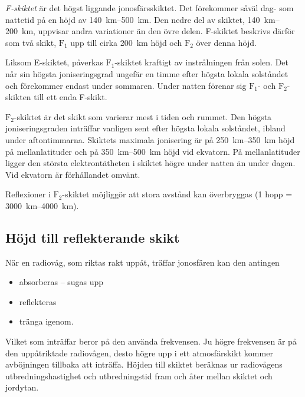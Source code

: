 \emph{F-skiktet} är det högst liggande jonosfärsskiktet.
Det förekommer såväl dag- som nattetid på en höjd av
\SIrange{140}{500}{\kilo\metre}.
Den nedre del av skiktet, \SIrange{140}{200}{\kilo\metre}, uppvisar andra
variationer än den övre delen.
F-skiktet beskrivs därför som två skikt, \(\mathrm{F_1}\) upp till cirka
\SI{200}{\kilo\metre} höjd och \(\mathrm{F_2}\) över denna höjd.

Liksom E-skiktet, påverkas \(\mathrm{F_1}\)-skiktet kraftigt av
instrålningen från solen.
Det når sin högsta joniseringsgrad ungefär en timme efter högsta lokala
solståndet och förekommer endast under sommaren.
Under natten förenar sig \(\mathrm{F_1}\)- och \(\mathrm{F_2}\)-skikten till
ett enda F-skikt.

\(\mathrm{F_2}\)-skiktet är det skikt som varierar mest i tiden och rummet.
Den högsta joniseringsgraden inträffar vanligen sent efter högsta lokala
solståndet, ibland under aftontimmarna.
Skiktets maximala jonisering är på \SIrange{250}{350}{\kilo\metre} höjd på
mellanlatituder och på \SIrange{350}{500}{\kilo\metre} höjd vid ekvatorn.
På mellanlatituder ligger den största elektrontätheten i skiktet högre under
natten än under dagen.
Vid ekvatorn är förhållandet omvänt.

Reflexioner i \(\mathrm{F_2}\)-skiktet möjliggör att stora
avstånd kan överbryggas (1 hopp = \SIrange{3000}{4000}{\kilo\metre}).


\subsection{Höjd till reflekterande skikt}

När en radiovåg, som riktas rakt uppåt, träffar jonosfären kan den antingen
\begin{itemize}
  \item absorberas -- sugas upp
  \item reflekteras
  \item tränga igenom.
\end{itemize}

Vilket som inträffar beror på den använda frekvensen.
Ju högre frekvensen är på den uppåtriktade radiovågen, desto högre upp i ett
atmosfärskikt kommer avböjningen tillbaka att inträffa.
Höjden till skiktet beräknas ur radiovågens utbredningshastighet och
utbredningstid fram och åter mellan skiktet och jordytan.


